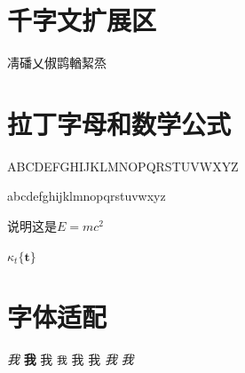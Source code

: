 \documentclass{article}
\begin{document}
\section{千字文扩展区}
凊磻乂俶鹍輶絜烝

\section{拉丁字母和数学公式}
ABCDEFGHIJKLMNOPQRSTUVWXYZ

abcdefghijklmnopqrstuvwxyz

说明$这是E=mc^2$

$\kappa_t\bm{\{t\}}$

\section{字体适配}
\emph{我}
\textbf{我}
\textsf{我}
\texttt{我}
\textmd{我}
\textup{我}
\textit{我}
\textsl{我}
\end{document}
